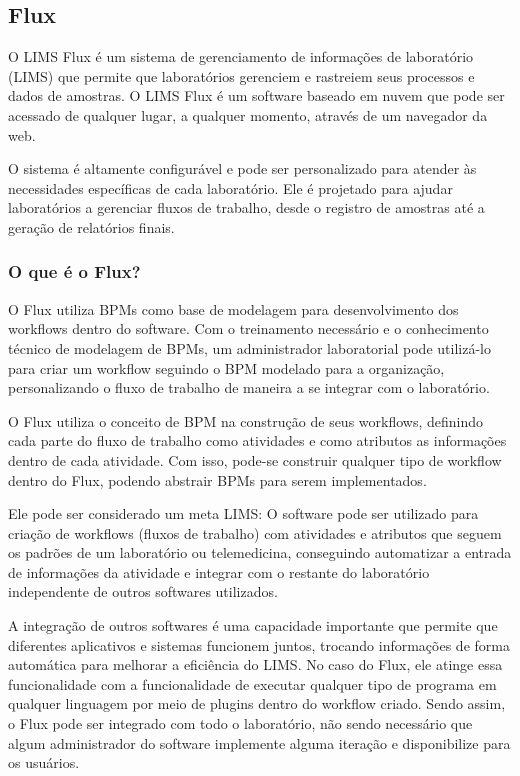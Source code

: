 \subsection{Flux} \label{sec:flux}


O LIMS Flux é um sistema de gerenciamento de informações de laboratório (LIMS) que permite que laboratórios gerenciem e rastreiem seus processos e dados de amostras. O LIMS Flux é um software baseado em nuvem que pode ser acessado de qualquer lugar, a qualquer momento, através de um navegador da web.

O sistema é altamente configurável e pode ser personalizado para atender às necessidades específicas de cada laboratório. Ele é projetado para ajudar laboratórios a gerenciar fluxos de trabalho, desde o registro de amostras até a geração de relatórios finais.

\subsubsection{O que é o Flux?}

O Flux utiliza BPMs como base de modelagem para desenvolvimento dos workflows dentro do software. Com o treinamento necessário e o conhecimento técnico de modelagem de BPMs, um administrador laboratorial pode utilizá-lo para criar um workflow seguindo o BPM modelado para a organização, personalizando o fluxo de trabalho de maneira a se integrar com o laboratório.

O Flux utiliza o conceito de BPM na construção de seus workflows, definindo cada parte do fluxo de trabalho como atividades e como atributos as informações dentro de cada atividade. Com isso, pode-se construir qualquer tipo de workflow dentro do Flux, podendo abstrair BPMs para serem implementados.

Ele pode ser considerado um meta LIMS: O software pode ser utilizado para criação de workflows (fluxos de trabalho) com atividades e atributos que seguem os padrões de um laboratório ou telemedicina, conseguindo automatizar a entrada de informações da atividade e integrar com o restante do laboratório independente de outros softwares utilizados.

A integração de outros softwares é uma capacidade importante que permite que diferentes aplicativos e sistemas funcionem juntos, trocando informações de forma automática para melhorar a eficiência do LIMS. No caso do Flux, ele atinge essa funcionalidade com a funcionalidade de executar qualquer tipo de programa em qualquer linguagem por meio de plugins dentro do workflow criado.
Sendo assim, o Flux pode ser integrado com todo o laboratório, não sendo necessário que algum administrador do software implemente alguma iteração e disponibilize para os usuários.

